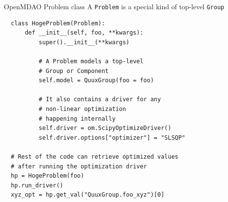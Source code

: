 \begin{frame}[fragile]{OpenMDAO Problem class}
  A \lstinline{Problem} is a special kind of top-level \lstinline{Group}

  \vspace{\baselineskip}

  \begin{lstlisting}
  class HogeProblem(Problem):
      def __init__(self, foo, **kwargs):
          super().__init__(**kwargs)

          # A Problem models a top-level
          # Group or Component
          self.model = QuuxGroup(foo = foo)

          # It also contains a driver for any
          # non-linear optimization
          # happening internally
          self.driver = om.ScipyOptimizeDriver()
          self.driver.options["optimizer"] = "SLSQP"

  # Rest of the code can retrieve optimized values
  # after running the optimization driver
  hp = HogeProblem(foo)
  hp.run_driver()
  xyz_opt = hp.get_val("QuuxGroup.foo_xyz")[0]
  \end{lstlisting}
\end{frame}
